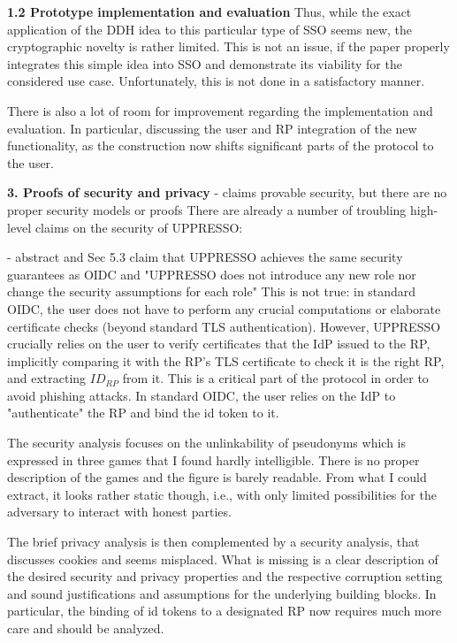 \documentclass[letterpaper,onecolumn,10pt]{article}
\begin{document}
\noindent\textbf{1.2 Prototype implementation and evaluation}
Thus, while the exact application of the DDH idea to this particular type of SSO seems new, the cryptographic novelty is rather limited.
This is not an issue, if the paper properly integrates this simple idea into SSO and demonstrate its viability for the considered use case.
Unfortunately, this is not done in a satisfactory manner.

There is also a lot of room for improvement regarding the implementation and evaluation. In particular, discussing the user and RP integration of the new functionality, as the construction now shifts significant parts of the protocol to the user.

\noindent\textbf{3. Proofs of security and privacy}
- claims provable security, but there are no proper security models or proofs
There are already a number of troubling high-level claims on the security of UPPRESSO:

- abstract and Sec 5.3 claim that UPPRESSO achieves the same security guarantees as OIDC and "UPPRESSO does not introduce any new role nor change the security assumptions for each role"
This is not true: in standard OIDC, the user does not have to perform any crucial computations or elaborate certificate checks (beyond standard TLS authentication). However, UPPRESSO crucially relies on the user to verify certificates that the IdP issued to the RP, implicitly comparing it with the RP's TLS certificate to check it is the right RP, and extracting $ID_{RP}$ from it. This is a critical part of the protocol in order to avoid phishing attacks. In standard OIDC, the user relies on the IdP to "authenticate" the RP and bind the id token to it.


The security analysis focuses on the unlinkability of pseudonyms which is expressed in three games that I found hardly intelligible. There is no proper description of the games and the figure is barely readable. From what I could extract, it looks rather static though, i.e., with only limited possibilities for the adversary to interact with honest parties.

The brief privacy analysis is then complemented by a security analysis, that discusses cookies and seems misplaced.
What is missing is a clear description of the desired security and privacy properties and the respective corruption setting and sound justifications and assumptions for the underlying building blocks. In particular, the binding of id tokens to a designated RP now requires much more care and should be analyzed.
\end{document}
